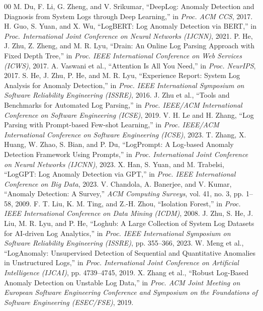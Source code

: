 \documentclass[conference]{IEEEtran}
\begin{document}
\begin{thebibliography}{00}
\scriptsize
\setlength{\itemsep}{-1pt}
\setlength{\parskip}{0pt}
 M. Du, F. Li, G. Zheng, and V. Srikumar, ``DeepLog: Anomaly Detection and Diagnosis from System Logs through Deep Learning,'' in \textit{Proc. ACM CCS}, 2017.
 H. Guo, S. Yuan, and X. Wu, ``LogBERT: Log Anomaly Detection via BERT,'' in \textit{Proc. International Joint Conference on Neural Networks (IJCNN)}, 2021.
 P. He, J. Zhu, Z. Zheng, and M. R. Lyu, ``Drain: An Online Log Parsing Approach with Fixed Depth Tree,'' in \textit{Proc. IEEE International Conference on Web Services (ICWS)}, 2017.
 A. Vaswani et al., ``Attention Is All You Need,'' in \textit{Proc. NeurIPS}, 2017.
 S. He, J. Zhu, P. He, and M. R. Lyu, ``Experience Report: System Log Analysis for Anomaly Detection,'' in \textit{Proc. IEEE International Symposium on Software Reliability Engineering (ISSRE)}, 2016.
 J. Zhu et al., ``Tools and Benchmarks for Automated Log Parsing,'' in \textit{Proc. IEEE/ACM International Conference on Software Engineering (ICSE)}, 2019.
 V. H. Le and H. Zhang, ``Log Parsing with Prompt-based Few-shot Learning,'' in \textit{Proc. IEEE/ACM International Conference on Software Engineering (ICSE)}, 2023.
 T. Zhang, X. Huang, W. Zhao, S. Bian, and P. Du, ``LogPrompt: A Log-based Anomaly Detection Framework Using Prompts,'' in \textit{Proc. International Joint Conference on Neural Networks (IJCNN)}, 2023.
 X. Han, S. Yuan, and M. Trabelsi, ``LogGPT: Log Anomaly Detection via GPT,'' in \textit{Proc. IEEE International Conference on Big Data}, 2023.
 V. Chandola, A. Banerjee, and V. Kumar, ``Anomaly Detection: A Survey,'' \textit{ACM Computing Surveys}, vol. 41, no. 3, pp. 1--58, 2009.
 F. T. Liu, K. M. Ting, and Z.-H. Zhou, ``Isolation Forest,'' in \textit{Proc. IEEE International Conference on Data Mining (ICDM)}, 2008.
 J. Zhu, S. He, J. Liu, M. R. Lyu, and P. He, ``Loghub: A Large Collection of System Log Datasets for AI-driven Log Analytics,'' in \textit{Proc. IEEE International Symposium on Software Reliability Engineering (ISSRE)}, pp. 355--366, 2023.
 W. Meng et al., ``LogAnomaly: Unsupervised Detection of Sequential and Quantitative Anomalies in Unstructured Logs,'' in \textit{Proc. International Joint Conference on Artificial Intelligence (IJCAI)}, pp. 4739--4745, 2019.
 X. Zhang et al., ``Robust Log-Based Anomaly Detection on Unstable Log Data,'' in \textit{Proc. ACM Joint Meeting on European Software Engineering Conference and Symposium on the Foundations of Software Engineering (ESEC/FSE)}, 2019.

\end{thebibliography}
\end{document}

